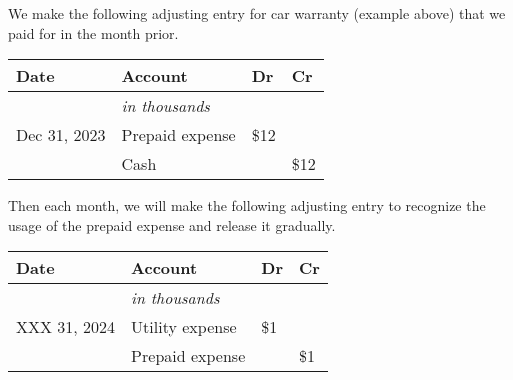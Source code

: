\small
\begin{tcolorbox}[colframe=black,colback=white,title=Example Adjusting Entry (Prepaid Expense)]
    We make the following adjusting entry for car warranty (example above) that we paid for in the month prior.

    \vspace{1em}
    \begin{tabular}{llll}
        \textbf{Date} & \textbf{Account}      & \textbf{Dr} & \textbf{Cr} \\
        \hline
                      & \textit{in thousands} &             &             \\
        Dec 31, 2023  & Prepaid expense       & \$12        &             \\
                      & \quad Cash            &             & \$12        \\
    \end{tabular}
    \vspace{1em}

    Then each month, we will make the following adjusting entry to recognize the usage of the prepaid expense and release it gradually.

    \vspace{1em}
    \begin{tabular}{llll}
        \textbf{Date} & \textbf{Account}      & \textbf{Dr} & \textbf{Cr} \\
        \hline
                      & \textit{in thousands} &             &             \\
        XXX 31, 2024  & Utility expense       & \$1         &             \\
                      & \quad Prepaid expense &             & \$1         \\
    \end{tabular}
    \vspace{1em}
\end{tcolorbox}

